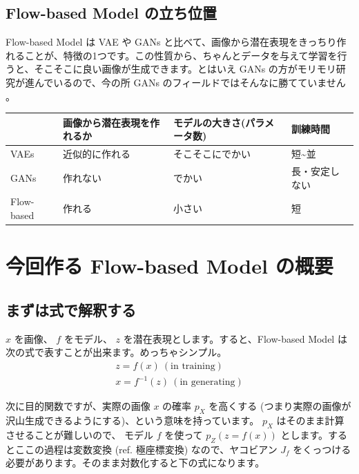 \documentclass[dvipdfmx]{article}
\begin{document}
\subsection{Flow-based Model の立ち位置}
\label{sec:orgd6a1e54}
Flow-based Model は VAE や GANs と比べて、画像から潜在表現をきっちり作れることが、特徴の1つです。この性質から、ちゃんとデータを与えて学習を行うと、そこそこに良い画像が生成できます。とはいえ GANs の方がモリモリ研究が進んでいるので、今の所 GANs のフィールドではそんなに勝てていません 。\\

\begin{center}
\begin{tabular}{llll}
\hline
 & 画像から潜在表現を作れるか & モデルの大きさ(パラメータ数) & 訓練時間\\
\hline
VAEs & 近似的に作れる & そこそこにでかい & 短\textasciitilde{}並\\
GANs & 作れない & でかい & 長・安定しない\\
Flow-based & 作れる & 小さい & 短\\
\hline
\end{tabular}

\end{center}
\section{今回作る Flow-based Model の概要}
\label{sec:orgb0e622f}
\subsection{まずは式で解釈する}
\label{sec:orgb4cbd1f}
\(x\) を画像、 \(f\) をモデル、 \(z\) を潜在表現とします。すると、Flow-based Model は次の式で表すことが出来ます。めっちゃシンプル。\\

\begin{eqnarray}
z = f(x) \ (\text{in training})\\
x = f^{-1}(z) \ (\text{in generating})
\end{eqnarray}

次に目的関数ですが、実際の画像 \(x\) の確率 \(p_X\) を高くする (つまり実際の画像が沢山生成できるようにする)、という意味を持っています。 \(p_X\)  はそのまま計算させることが難しいので、 モデル \(f\) を使って \(p_Z (z = f(x))\) とします。するとここの過程は変数変換 (ref. 極座標変換) なので、ヤコビアン \(J_f\) をくっつける必要があります。そのまま対数化すると下の式になります。\\
\end{document}

